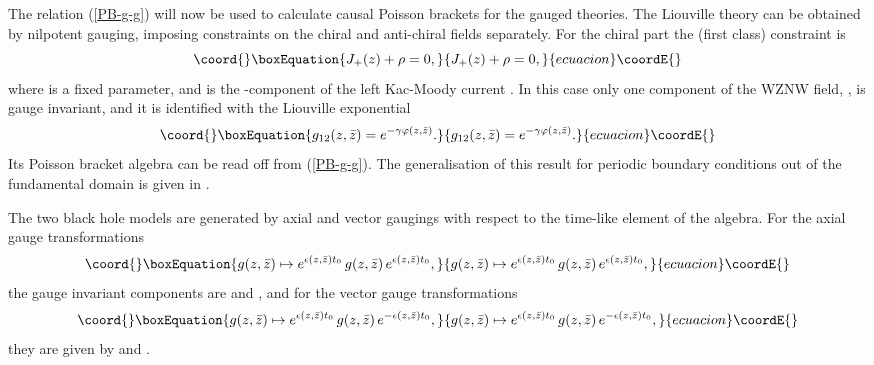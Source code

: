 \documentclass[a4paper,12pt]{article}
\providecommand{\rr}{\mathbb{R}}
\begin{document}
The relation (\ref{PB-g-g}) will now be used to calculate
causal Poisson brackets for the gauged \myHighlight{$SL(2,\rr)$}\coordHE{} theories. The
Liouville theory can be obtained by nilpotent gauging, imposing
constraints on the chiral and anti-chiral fields separately. For the
chiral part the (first class)
constraint is
\begin{equation}\coord{}\boxEquation{\label{constraint}
J_+(z)+\rho =0,
}{J_+(z)+\rho =0,
}{ecuacion}\coordE{}\end{equation}
where \coordHE{} is a fixed parameter, and  \coordHE{}
is the \coordHE{}-component of the left  Kac-Moody current \coordHE{}.
In this case only one component of the WZNW field, \coordHE{},
is gauge invariant, and it
is identified with the Liouville exponential
\cite{BFFOW, JW}
\begin{equation}\coord{}\boxEquation{\label{varphi}
g_{12}(z,\bar z)=
e^{-\gamma \varphi(z, \bar z)}.
}{g_{12}(z,\bar z)=
e^{-\gamma \varphi(z, \bar z)}.
}{ecuacion}\coordE{}\end{equation}
Its Poisson bracket algebra can be read off from
 (\ref{PB-g-g}).
The generalisation of this result for periodic boundary conditions
out of the fundamental domain is given in \cite{JW}.


The two black hole models \cite{BCR, FJW} are generated by axial and
vector gaugings with respect to the time-like element \coordHE{}
of the \myHighlight{$sl(2,\rr)$}\coordHE{} algebra. For the
axial gauge transformations
\begin{equation}\coord{}\boxEquation{\label{axial}
g(z,\bar z)\mapsto e^{\epsilon(z,\bar z)t_0}\,g(z,\bar z)\,
e^{\epsilon(z,\bar z)t_0},
}{g(z,\bar z)\mapsto e^{\epsilon(z,\bar z)t_0}\,g(z,\bar z)\,
e^{\epsilon(z,\bar z)t_0},
}{ecuacion}\coordE{}\end{equation}
the gauge invariant components are \coordHE{}
and \coordHE{}, and for the vector gauge
transformations
\begin{equation}\coord{}\boxEquation{\label{vector}
g(z,\bar z)\mapsto e^{\epsilon(z,\bar z)t_0}\,g(z,\bar z)\,
e^{-\epsilon(z,\bar z)t_0},
}{g(z,\bar z)\mapsto e^{\epsilon(z,\bar z)t_0}\,g(z,\bar z)\,
e^{-\epsilon(z,\bar z)t_0},
}{ecuacion}\coordE{}\end{equation}
they are given by \coordHE{} and \coordHE{}.
\end{document}
